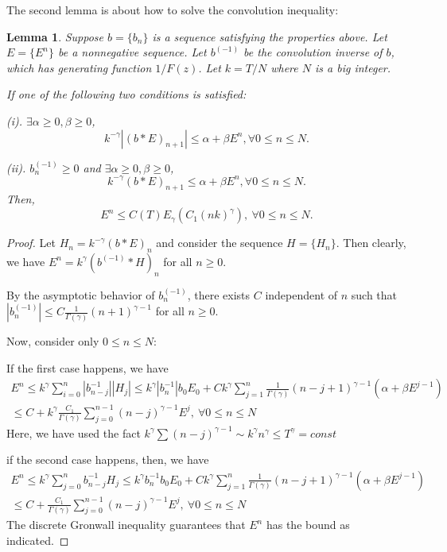 \documentclass[11pt]{article}
\newtheorem{lmm}{Lemma}
\begin{document}
The second lemma is about how to solve the convolution inequality:
\begin{lmm}
Suppose $b=\{b_n\}$ is a sequence satisfying the properties above. Let $E=\{E^n\}$ be a nonnegative sequence. Let $b^{(-1)}$ be the convolution inverse of $b$, which has generating function $1/F(z)$. Let $k=T/N$ where $N$ is a big integer.

If one of the following two conditions is satisfied:

 (i). $\exists \alpha\ge 0,\beta\ge 0$,
 $$
k^{-\gamma}|(b*E)_{n+1}|\le \alpha+\beta E^n,\forall 0\le n\le N.
$$

(ii). $b^{(-1)}_n\ge 0$ and $\exists \alpha\ge0, \beta\ge0$,
$$
k^{-\gamma}(b*E)_{n+1}\le \alpha+\beta E^n,\forall 0\le n\le N.
$$
Then, $$
E^n\le C(T)E_{\gamma}(C_1(nk)^{\gamma}),\ \forall 0\le n\le N.
$$
\end{lmm}
\begin{proof}
Let $H_n=k^{-\gamma}(b*E)_{n}$ and consider the sequence $H=\{H_n\}$. Then clearly, we have $E^n=k^{\gamma}(b^{(-1)}*H)_n$ for all $n\ge 0$.

By the asymptotic behavior of $b^{(-1)}_n$, there exists $C$ independent of $n$ such that $|b^{(-1)}_n|\le C \frac{1}{\Gamma(\gamma)}(n+1)^{\gamma-1}$ for all $n\ge 0$.

Now, consider only $0\le n\le N$:

If the first case happens, we have 
\begin{gather*}
E^n\le k^{\gamma}\sum_{i=0}^n |b_{n-j}^{-1}| |H_{j}|
\le k^{\gamma}|b_n^{-1}|b_0E_0+Ck^{\gamma}\sum_{j=1}^{n} \frac{1}{\Gamma(\gamma)}(n-j+1)^{\gamma-1}
(\alpha+\beta E^{j-1})\\
\le C+k^{\gamma}\frac{C_1}{\Gamma(\gamma)}\sum_{j=0}^{n-1}(n-j)^{\gamma-1}E^j,\ \forall 0\le n\le N
\end{gather*}
Here, we have used the fact $k^{\gamma}\sum (n-j)^{\gamma-1}\sim k^{\gamma}n^{\gamma}\le T^{\gamma}=const$

if the second case happens, then, we have 
\begin{gather*}
E^n\le k^{\gamma}\sum_{j=0}^n b_{n-j}^{-1} H_{j}
\le k^{\gamma}b_n^{-1}b_0E_0+Ck^{\gamma}\sum_{j=1}^{n} \frac{1}{\Gamma(\gamma)}(n-j+1)^{\gamma-1}
(\alpha+\beta E^{j-1})\\
\le C+\frac{C_1}{\Gamma(\gamma)}\sum_{j=0}^{n-1}(n-j)^{\gamma-1}E^j,\ \forall 0\le n\le N
\end{gather*}
The discrete Gronwall inequality guarantees that $E^n$ has the bound as indicated.
\end{proof}
\end{document}
